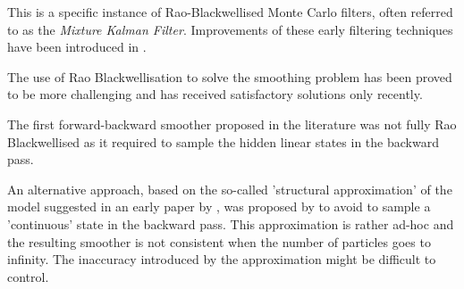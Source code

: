 This is a specific instance of Rao-Blackwellised Monte Carlo filters, often referred to as the \emph{Mixture Kalman Filter}. %
Improvements of these early filtering techniques  have been introduced in \cite{doucet:gordon:krishnamurthy:2001,schon:gustafsson:nordlund:2005}. %

The use of Rao Blackwellisation to solve the smoothing problem has been proved to be more challenging and has received satisfactory solutions only recently. 

The first forward-backward smoother proposed in the literature \cite{fong:godsill:doucet:west:2002} was not fully Rao Blackwellised as it required to sample the hidden linear states in the backward pass. 

An alternative approach, based on the so-called  'structural approximation' of the model suggested in an early paper by \cite{kim:1994}, was proposed by \cite{barber:2006} to avoid to sample a 'continuous' state in the backward pass. This approximation is rather ad-hoc and the resulting smoother is not consistent when the number of particles goes to infinity.
The inaccuracy  introduced by the approximation might be difficult to control.

